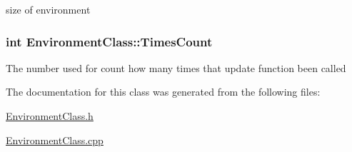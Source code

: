 size of environment \hypertarget{classEnvironmentClass_afeb46604acaea75228549ed700f331a0}{
\subsubsection[{Times\-Count}]{\setlength{\rightskip}{0pt plus 5cm}int Environment\-Class\-::\-Times\-Count\hspace{0.3cm}{\ttfamily [private]}}}\label{classEnvironmentClass_afeb46604acaea75228549ed700f331a0}
The number used for count how many times that update function been called 

The documentation for this class was generated from the following files\-:\begin{DoxyCompactItemize}
\item 
\hyperlink{EnvironmentClass_8h}{Environment\-Class.\-h}\item 
\hyperlink{EnvironmentClass_8cpp}{Environment\-Class.\-cpp}\end{DoxyCompactItemize}
